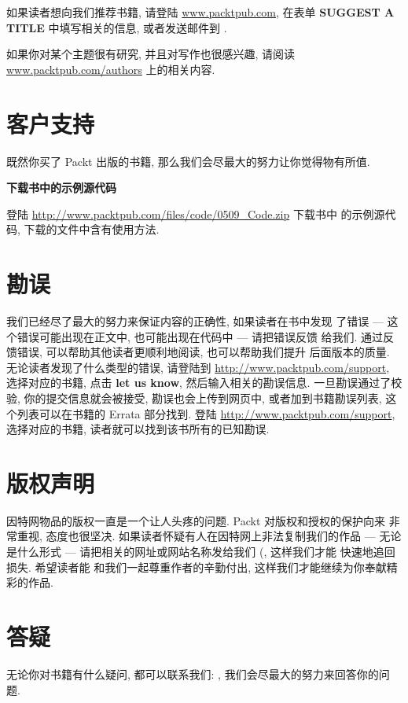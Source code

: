 如果读者想向我们推荐书籍, 请登陆 \url{www.packtpub.com}, 在表单
\textbf{SUGGEST A TITLE} 中填写相关的信息, 或者发送邮件到
.

如果你对某个主题很有研究, 并且对写作也很感兴趣, 请阅读
\url{www.packtpub.com/authors} 上的相关内容.

\section*{客户支持}
\label{sec:customer_support}
既然你买了 Packt 出版的书籍, 那么我们会尽最大的努力让你觉得物有所值.
\begin{warning}
    \textbf{下载书中的示例源代码}

    登陆 \url{http://www.packtpub.com/files/code/0509_Code.zip} 下载书中
    的示例源代码, 下载的文件中含有使用方法.
\end{warning}

\section*{勘误}
\label{sec:errata}

我们已经尽了最大的努力来保证内容的正确性, 如果读者在书中发现
了错误 --- 这个错误可能出现在正文中, 也可能出现在代码中 --- 请把错误反馈
给我们. 通过反馈错误, 可以帮助其他读者更顺利地阅读, 也可以帮助我们提升
后面版本的质量. 无论读者发现了什么类型的错误, 请登陆到
\url{http://www.packtpub.com/support}, 选择对应的书籍, 点击 \textbf{let us
know}, 然后输入相关的勘误信息. 一旦勘误通过了校验, 你的提交信息就会被接受,
勘误也会上传到网页中, 或者加到书籍勘误列表, 这个列表可以在书籍的 Errata
部分找到. 登陆 \url{http://www.packtpub.com/support}, 选择对应的书籍,
读者就可以找到该书所有的已知勘误.

\section*{版权声明}
\label{sec:piracy}

因特网物品的版权一直是一个让人头疼的问题. Packt 对版权和授权的保护向来
非常重视, 态度也很坚决. 如果读者怀疑有人在因特网上非法复制我们的作品 ---
无论是什么形式 --- 请把相关的网址或网站名称发给我们
(, 这样我们才能 快速地追回损失. 希望读者能
和我们一起尊重作者的辛勤付出, 这样我们才能继续为你奉献精彩的作品.

\section*{答疑}
\label{sec:questions}
无论你对书籍有什么疑问, 都可以联系我们: ,
我们会尽最大的努力来回答你的问题.
